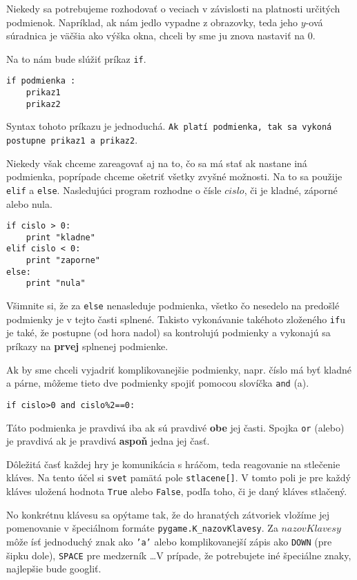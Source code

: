
Niekedy sa potrebujeme rozhodovať o veciach v závislosti na platnosti určitých podmienok. Napríklad,
ak nám jedlo vypadne z obrazovky, teda jeho $y$-ová súradnica je väčšia ako výška okna, chceli by
sme ju znova nastaviť na $0$.

Na to nám bude slúžiť príkaz \texttt{if}.

\begin{lstlisting}
if podmienka :
    prikaz1
    prikaz2
\end{lstlisting}

Syntax tohoto príkazu je jednoduchá. \texttt{Ak platí podmienka, tak sa vykoná postupne prikaz1 a
prikaz2}.

Niekedy však chceme zareagovať aj na to, čo sa má stať ak nastane iná podmienka, poprípade chceme
ošetriť všetky zvyšné možnosti. Na to sa použije \texttt{elif} a \texttt{else}. Nasledujúci program
rozhodne o čísle $cislo$, či je kladné, záporné alebo nula.

\begin{lstlisting}
if cislo > 0:
    print "kladne"
elif cislo < 0:
    print "zaporne"
else:
    print "nula"
\end{lstlisting}

Všimnite si, že za \texttt{else} nenasleduje podmienka, všetko čo nesedelo na predošlé podmienky je
v tejto časti splnené. Takisto vykonávanie takéhoto zloženého \texttt{if}u je také, že postupne (od
hora nadol) sa kontrolujú podmienky a vykonajú sa príkazy na \textbf{prvej} splnenej podmienke.

Ak by sme chceli vyjadriť komplikovanejšie podmienky, napr. číslo má byť kladné a párne, môžeme
tieto dve podmienky spojiť pomocou slovíčka \texttt{and} (a).

\texttt{if cislo>0 and cislo\%2==0:}

Táto podmienka je pravdivá iba ak sú pravdivé \textbf{obe} jej časti. Spojka \texttt{or} (alebo) je
pravdivá ak je pravdivá \textbf{aspoň} jedna jej časť.


Dôležitá časť každej hry je komunikácia s hráčom, teda reagovanie na stlečenie kláves. Na tento účel
si \texttt{svet} pamätá pole \texttt{stlacene[]}. V tomto poli je pre každý kláves uložená hodnota
\texttt{True} alebo \texttt{False}, podľa toho, či je daný kláves stlačený.

No konkrétnu klávesu sa opýtame tak, že do hranatých zátvoriek vložíme jej pomenovanie v špeciálnom
formáte \texttt{pygame.K\_nazovKlavesy}. Za $nazovKlavesy$ môže ísť jednoduchý znak ako \texttt{'a'}
alebo komplikovanejší zápis ako \texttt{DOWN} (pre šipku dole), \texttt{SPACE} pre medzerník \dots V
prípade, že potrebujete iné špeciálne znaky, najlepšie bude googliť.

